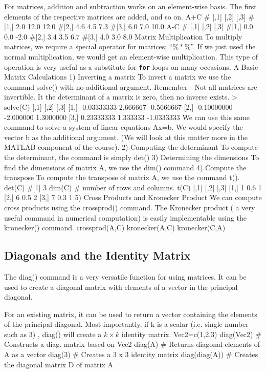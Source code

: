 For matrices, addition and subtraction works on an element-wise basis. 
The first elements of the respective matrices are added, and so on.
A+C # [,1] [,2] [,3] #[1,] 2.0 12.0 12.0 #[2,] 4.6 4.5 7.3 #[3,] 6.0 7.0 10.0 A-C # [,1] [,2] [,3] #[1,] 0.0 0.0 -2.0 #[2,] 3.4 3.5 6.7 #[3,] 4.0 3.0 8.0
Matrix Multiplication To multiply matrices, we require a special operator for matrices; “$\%*\%$”. 
If we just used the normal multiplication, we would get an element-wise multiplication.
This type of operation is very useful as a substitute for \textbf{\texttt{for}} loops on many occasions. A %
Basic Matrix Calculations 1) Inverting a matrix To invert a matrix we use the command solve() with no additional argument. Remember - Not all matrices are invertible. It the determinant of a matrix is zero, then no inverse exists.
> solve(C) [,1] [,2] [,3] [1,] -0.03333333 2.666667 -0.5666667 [2,] -0.10000000 -2.000000 1.3000000 [3,] 0.23333333 1.333333 -1.0333333
We can use this same command to solve a system of linear equations Ax=b. We would specify the vector b as the additional argument. (We will look at this matter more in the MATLAB component of the course).
2) Computing the determinant To compute the determinant, the command is simply det() 3) Determining the dimensions To find the dimensions of matrix A, we use the dim() command
4) Compute the transpose To compute the transpose of matrix A, we use the command t(). det(C) #[1] 3 dim(C) # number of rows and columns. t(C) [,1] [,2] [,3] [1,] 1 0.6 1 [2,] 6 0.5 2 [3,] 7 0.3 1
5) Cross Products and Kronecker Product We can compute cross products using the crossprod() command. The Kronecker product ( a very useful command in numerical computation) is easily implementable using the kronecker() command. crossprod(A,C) kronecker(A,C) kronecker(C,A)
\subsection{Diagonals and the Identity Matrix}
The diag() command is a very versatile function for using matrices. It can be used to create a diagonal matrix with elements of a vector in the principal diagonal. 

For an existing matrix, it can be used to return a vector containing the elements of the principal diagonal. Most importantly, if k is a scalar (i.e. single number such as 3) , diag() will create a $k \times k$ identity matrix.
Vec2=c(1,2,3) diag(Vec2) # Constructs a diag. matrix based on Vec2 diag(A) 
# Returns diagonal elements of A as a vector diag(3) 
# Creates a 3 x 3 identity matrix diag(diag(A)) 
# Creates the diagonal matrix D of matrix A
